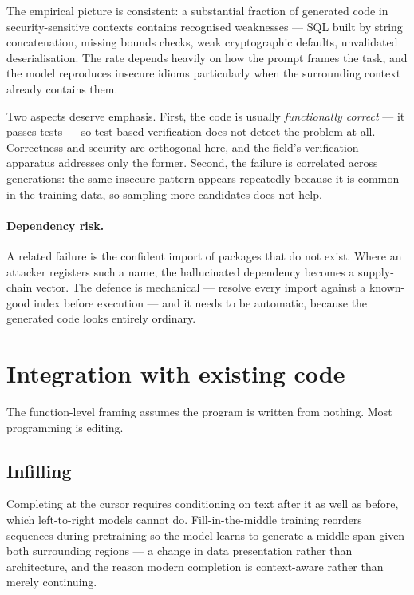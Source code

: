 \documentclass[11pt,a4paper]{article}
\begin{document}
The empirical picture is consistent: a substantial fraction of generated code
in security-sensitive contexts contains recognised weaknesses \cite{pearce2022}
--- SQL built by string concatenation, missing bounds checks, weak
cryptographic defaults, unvalidated deserialisation. The rate depends heavily
on how the prompt frames the task, and the model reproduces insecure idioms
particularly when the surrounding context already contains them.

Two aspects deserve emphasis. First, the code is usually \emph{functionally
correct} --- it passes tests --- so test-based verification does not detect the
problem at all. Correctness and security are orthogonal here, and the field's
verification apparatus addresses only the former. Second, the failure is
correlated across generations: the same insecure pattern appears repeatedly
because it is common in the training data, so sampling more candidates does
not help.

\paragraph{Dependency risk.}
A related failure is the confident import of packages that do not exist. Where
an attacker registers such a name, the hallucinated dependency becomes a
supply-chain vector. The defence is mechanical --- resolve every import
against a known-good index before execution --- and it needs to be automatic,
because the generated code looks entirely ordinary.

\section{Integration with existing code}
\label{sec:integration}

The function-level framing assumes the program is written from nothing. Most
programming is editing.

\subsection{Infilling}

Completing at the cursor requires conditioning on text after it as well as
before, which left-to-right models cannot do. Fill-in-the-middle training
\cite{fried2023} reorders sequences during pretraining so the model learns to
generate a middle span given both surrounding regions --- a change in data
presentation rather than architecture, and the reason modern completion is
context-aware rather than merely continuing.
\end{document}
